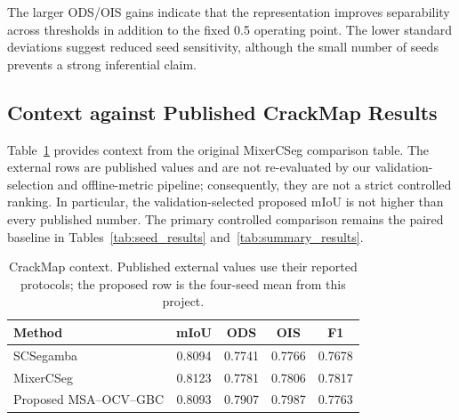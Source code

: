 \documentclass[preprint,12pt]{elsarticle}
\newcommand{\method}{MSA--OCV--GBC}
\begin{document}
\begin{table}[H]
\centering
\caption{Four-seed CrackMap summary. Baseline and proposed values are mean$\pm$std; the interval is computed from paired seed differences.}
\label{tab:summary_results}
\end{table}

The larger ODS/OIS gains indicate that the representation improves separability across thresholds in addition to the fixed 0.5 operating point. The lower standard deviations suggest reduced seed sensitivity, although the small number of seeds prevents a strong inferential claim.

\subsection{Context against Published CrackMap Results}

Table~\ref{tab:published_context} provides context from the original MixerCSeg comparison table. The external rows are published values and are not re-evaluated by our validation-selection and offline-metric pipeline; consequently, they are not a strict controlled ranking. In particular, the validation-selected proposed mIoU is not higher than every published number. The primary controlled comparison remains the paired baseline in Tables~\ref{tab:seed_results} and~\ref{tab:summary_results}.

\begin{table}[H]
\centering
\caption{CrackMap context. Published external values use their reported protocols; the proposed row is the four-seed mean from this project.}
\label{tab:published_context}
\begin{tabular}{lcccc}
\toprule
Method & mIoU & ODS & OIS & F1 \\
\midrule
SCSegamba~\cite{liu2025scsegamba} & 0.8094 & 0.7741 & 0.7766 & 0.7678 \\
MixerCSeg~\cite{zhao2026mixercseg} & 0.8123 & 0.7781 & 0.7806 & 0.7817 \\
Proposed \method & 0.8093 & 0.7907 & 0.7987 & 0.7763 \\
\bottomrule
\end{tabular}
\end{table}
\end{document}
